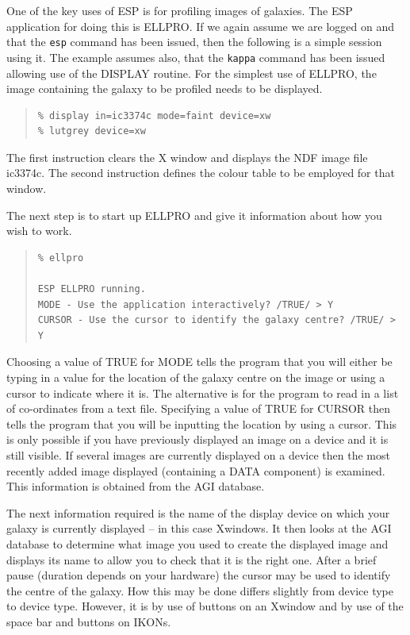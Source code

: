 \documentclass[twoside,11pt]{article}
\newcommand{\xref}[3]{#1}
\newenvironment{myquote}{\begin{quote}\begin{small}}{\end{small}\end{quote}}
\begin{document}
One of the key uses of ESP is for profiling images of galaxies.
The ESP application for doing this is ELLPRO. If we again assume we
are logged on and that the {\tt esp} command has been issued,
then the following is a simple session using it. The example 
assumes also, that the {\tt kappa} command has been issued allowing use of the
\xref{DISPLAY}{sun95}{DISPLAY} routine. For the simplest use of ELLPRO, the image containing
the galaxy to be profiled needs to be displayed.

\begin{myquote}
\begin{verbatim}
% display in=ic3374c mode=faint device=xw 
% lutgrey device=xw
\end{verbatim}
\end{myquote}

The first instruction clears the X window and displays the NDF image file 
ic3374c. The second instruction defines 
the colour table to be employed for that window. 

The next step is to start up ELLPRO and give it information about how
you wish to work. 

\begin{myquote}
\begin{verbatim}
% ellpro

ESP ELLPRO running.
MODE - Use the application interactively? /TRUE/ > Y
CURSOR - Use the cursor to identify the galaxy centre? /TRUE/ > Y
\end{verbatim}
\end{myquote}
 
Choosing a value of TRUE for MODE tells the program that you will
either be typing in a value for the location of the galaxy centre on the image
or using a cursor to indicate where it is. The alternative is for the program to
read in a list of co-ordinates from a text file. Specifying a value of TRUE
for CURSOR then tells the program that you will be inputting the location by
using a cursor. This is only possible if you have previously displayed an
image on a device and it is still visible. If several images are currently
displayed on a device then the most recently added image displayed 
(containing a DATA component) is examined. This information is obtained from
the AGI database.

The next information required is the
name of the display device on which your galaxy is currently displayed --
in this case Xwindows. It then looks at the AGI database to determine 
what image you used to create the displayed image and displays its name
to allow you to check that it is the right one. After a brief pause
(duration depends on your hardware) the cursor may be used to identify the
centre of the galaxy. How this may be done differs slightly from device type to
device type. However, it is by use of buttons on an Xwindow and by use
of the space bar and buttons on IKONs.
\end{document}
